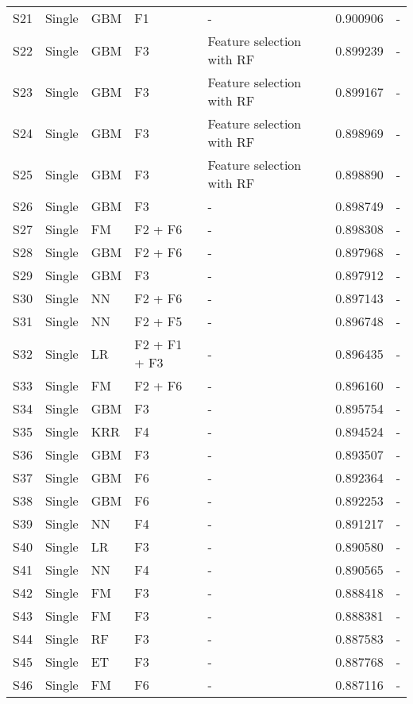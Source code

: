 \begin{table*}[t]
\begin{center}
\begin{minipage}{\textwidth}
{\begin{tabular}{lllllll}
S21	& Single 	& GBM		& F1					& - 						& 0.900906	& - \\
S22	& Single	& GBM		& F3					& Feature selection with RF	& 0.899239	& - \\
S23	& Single	& GBM		& F3					& Feature selection with RF	& 0.899167	& - \\
S24	& Single	& GBM		& F3					& Feature selection with RF	& 0.898969	& - \\
S25 	& Single	& GBM		& F3					& Feature selection with RF	& 0.898890	& - \\
S26 	& Single	& GBM		& F3					& - 						& 0.898749	& - \\
S27	& Single	& FM		& F2 + F6				& - 						& 0.898308	& - \\
S28  & Single	& GBM		& F2 + F6				& - 						& 0.897968	& - \\
S29	& Single	& GBM		& F3					& - 						& 0.897912	& - \\
S30	& Single	& NN		& F2 + F6				& - 						& 0.897143	& - \\
S31	& Single	& NN		& F2 + F5				& - 						& 0.896748	& - \\
S32	& Single	& LR			& F2 + F1 + F3			& - 						& 0.896435 	& - \\
S33  & Single	& FM		& F2 + F6				& - 						& 0.896160	& - \\
S34  & Single	& GBM		& F3					& - 						& 0.895754	& - \\
S35	& Single	& KRR		& F4					& - 						& 0.894524	& - \\
S36 	& Single	& GBM		& F3					& - 						& 0.893507	& - \\
S37	& Single	& GBM		& F6					& - 						& 0.892364	& - \\
S38 	& Single	& GBM		& F6					& - 						& 0.892253	& - \\
S39 	& Single	& NN		& F4					& - 						& 0.891217	& - \\
S40	& Single	& LR			& F3					& - 						& 0.890580	& - \\
S41	& Single	& NN		& F4					& - 						& 0.890565	& - \\
S42 	& Single	& FM		& F3					& - 						& 0.888418	& - \\
S43	& Single	& FM		& F3					& - 						& 0.888381	& - \\
S44	& Single	& RF			& F3					& - 						& 0.887583	& - \\
S45	& Single	& ET			& F3					& - 						& 0.887768	& - \\
S46 	& Single	& FM		& F6					& - 						& 0.887116	& - \\

\end{tabular}}
\end{minipage}
\end{center}
\end{table*}
